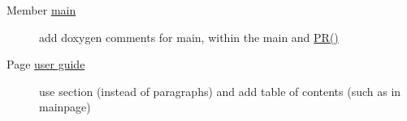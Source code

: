 \label{todo__todo000002}
\hypertarget{todo__todo000002}{}
 \begin{description}
\item[Member \hyperlink{CImg_8display_8cpp_3c04138a5bfe5d72780bb7e82a18e627}{main} ]add doxygen comments for main, within the main and \hyperlink{CImg_8display_8cpp_ea1ac050c1347d4a67f85cbfc88ec8cf}{PR()} \end{description}


\label{todo__todo000001}
\hypertarget{todo__todo000001}{}
 \begin{description}
\item[Page \hyperlink{user}{user guide} ]use section (instead of paragraphs) and add table of contents (such as in mainpage)

\end{description}
